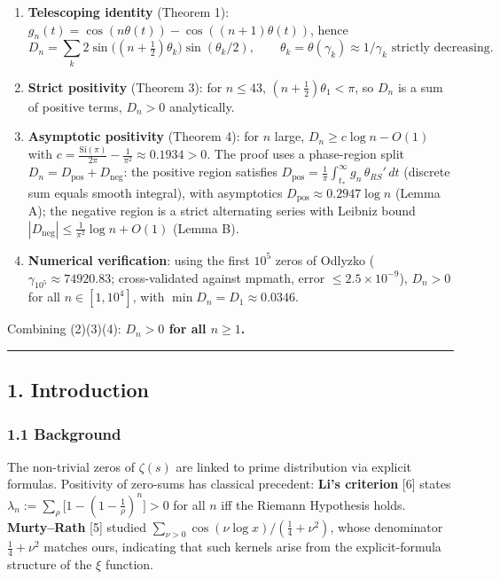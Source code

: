 \documentclass[
]{article}
\begin{document}
\begin{enumerate}
\def\labelenumi{\arabic{enumi}.}
\item
  \textbf{Telescoping identity} (Theorem 1):
  \(g_n(t) = \cos(n\theta(t)) - \cos((n+1)\theta(t))\), hence
  \[D_n = \sum_k 2\sin\!\big((n+\tfrac12)\theta_k\big)\sin(\theta_k/2), \qquad \theta_k = \theta(\gamma_k) \approx 1/\gamma_k \text{ strictly decreasing}.\]
\item
  \textbf{Strict positivity} (Theorem 3): for \(n \le 43\),
  \((n+\tfrac12)\theta_1 < \pi\), so \(D_n\) is a sum of positive terms,
  \(D_n > 0\) analytically.
\item
  \textbf{Asymptotic positivity} (Theorem 4): for \(n\) large,
  \(D_n \ge c\log n - O(1)\) with
  \(c = \tfrac{\mathrm{Si}(\pi)}{2\pi} - \tfrac{1}{\pi^2} \approx 0.1934 > 0\).
  The proof uses a phase-region split
  \(D_n = D_{\mathrm{pos}} + D_{\mathrm{neg}}\): the positive region
  satisfies
  \(D_{\mathrm{pos}} = \frac1\pi\int_{t_*}^\infty g_n\,\theta_{RS}'\,dt\)
  (discrete sum equals smooth integral), with asymptotics
  \(D_{\mathrm{pos}} \approx 0.2947\log n\) (Lemma A); the negative
  region is a strict alternating series with Leibniz bound
  \(|D_{\mathrm{neg}}| \le \frac{1}{\pi^2}\log n + O(1)\) (Lemma B).
\item
  \textbf{Numerical verification}: using the first \(10^5\) zeros of
  Odlyzko (\(\gamma_{10^5} \approx 74920.83\); cross-validated against
  mpmath, error \(\le 2.5\times10^{-9}\)), \(D_n > 0\) for all
  \(n \in [1, 10^4]\), with \(\min D_n = D_1 \approx 0.0346\).
\end{enumerate}

Combining (2)(3)(4): \textbf{\(D_n > 0\) for all \(n \ge 1\).}

\begin{center}\rule{0.5\linewidth}{0.5pt}\end{center}

\hypertarget{introduction}{%
\subsection{1. Introduction}\label{introduction}}

\hypertarget{background}{%
\subsubsection{1.1 Background}\label{background}}

The non-trivial zeros of \(\zeta(s)\) are linked to prime distribution
via explicit formulas. Positivity of zero-sums has classical precedent:
\textbf{Li's criterion} {[}6{]} states
\(\lambda_n := \sum_\rho\big[1-(1-\tfrac1\rho)^n\big] > 0\) for all
\(n\) iff the Riemann Hypothesis holds. \textbf{Murty--Rath} {[}5{]}
studied \(\sum_{\nu>0}\cos(\nu\log x)/(\tfrac14+\nu^2)\), whose
denominator \(\tfrac14+\nu^2\) matches ours, indicating that such
kernels arise from the explicit-formula structure of the \(\xi\)
function.
\end{document}
